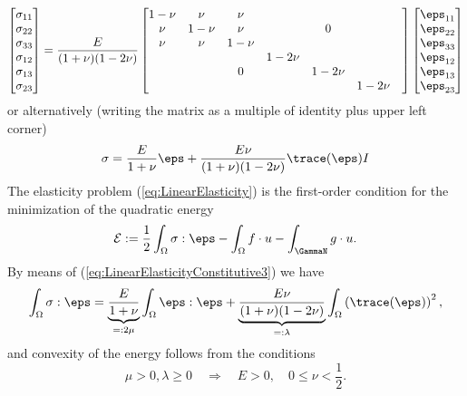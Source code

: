 \begin{equation}\label{eq:LinearElasticityConstitutive2}
\begin{bmatrix}
\sigma_{11}\\ \sigma_{22}\\ \sigma_{33}\\ \sigma_{12}\\ \sigma_{13}\\ \sigma_{23}
\end{bmatrix}
=
\frac{E}{(1+\nu)(1-2\nu)}
\begin{bmatrix}
1-\nu& \nu& \nu& & & & \\
\nu& 1-\nu& \nu& & 0& & \\
\nu& \nu& 1-\nu& & & & \\
& & & 1-2\nu& & & \\
& & 0& & 1-2\nu& & \\
& & & & & 1-2\nu&
\end{bmatrix}
\begin{bmatrix}
\eps_{11}\\ \eps_{22}\\ \eps_{33}\\ \eps_{12}\\ \eps_{13}\\ \eps_{23}
\end{bmatrix}
\end{equation}
%
or alternatively (writing the matrix as a multiple of identity plus upper left corner)
%
\begin{equation}\label{eq:LinearElasticityConstitutive3}
\sigma = \frac{E}{1+\nu}\eps + \frac{E\nu}{(1+\nu)(1-2\nu)}\trace(\eps) I
\end{equation}
%
%
The elasticity problem (\ref{eq:LinearElasticity}) is the first-order condition for the minimization of the quadratic energy
%
\begin{equation}\label{eq:LinearElasticityEnergy}
\mathcal E := \frac12\int_{\Omega}\sigma:\eps - \int_{\Omega}f\cdot u - \int_{\GammaN}g\cdot u.
\end{equation}
%
By means of (\ref{eq:LinearElasticityConstitutive3}) we have
%
\begin{align*}
\int_{\Omega}\sigma:\eps = \underbrace{\frac{E}{1+\nu}}_{=:2\mu}\int_{\Omega}\eps:\eps + \underbrace{\frac{E\nu}{(1+\nu)(1-2\nu)}}_{=:\lambda}\int_{\Omega}\left(\trace(\eps)\right)^2,
\end{align*}
%
and convexity of the energy follows from the conditions
%
\begin{equation}\label{eq:CondEllipticity}
\mu> 0, \lambda\ge0 \quad\Rightarrow\quad E>0,\quad 0\le \nu <  \frac12.
\end{equation}
